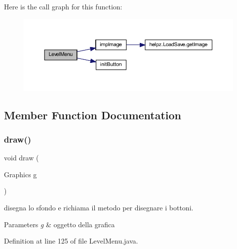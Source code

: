 Here is the call graph for this function\+:
\nopagebreak
\begin{figure}[H]
\begin{center}
\leavevmode
\includegraphics[width=350pt]{classui_1_1_level_menu_a08d3dc37d2a120ac517986d021c999c0_cgraph}
\end{center}
\end{figure}


\subsection{Member Function Documentation}
\mbox{\label{classui_1_1_level_menu_a72fe1ffca978e99fd16994a10e7f8051}} 
\subsubsection{\texorpdfstring{draw()}{draw()}}
{\footnotesize\ttfamily void draw (\begin{DoxyParamCaption}\item[{Graphics}]{g }\end{DoxyParamCaption})}



disegna lo sfondo e richiama il metodo per disegnare i bottoni. 


\begin{DoxyParams}{Parameters}
{\em g} & oggetto della grafica \\
\hline
\end{DoxyParams}


Definition at line 125 of file Level\+Menu.\+java.

